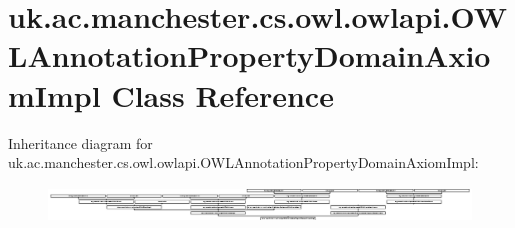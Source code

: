 \hypertarget{classuk_1_1ac_1_1manchester_1_1cs_1_1owl_1_1owlapi_1_1_o_w_l_annotation_property_domain_axiom_impl}{\section{uk.\-ac.\-manchester.\-cs.\-owl.\-owlapi.\-O\-W\-L\-Annotation\-Property\-Domain\-Axiom\-Impl Class Reference}
\label{classuk_1_1ac_1_1manchester_1_1cs_1_1owl_1_1owlapi_1_1_o_w_l_annotation_property_domain_axiom_impl}
}
Inheritance diagram for uk.\-ac.\-manchester.\-cs.\-owl.\-owlapi.\-O\-W\-L\-Annotation\-Property\-Domain\-Axiom\-Impl\-:\begin{figure}[H]
\begin{center}
\leavevmode
\includegraphics[height=0.956720cm]{classuk_1_1ac_1_1manchester_1_1cs_1_1owl_1_1owlapi_1_1_o_w_l_annotation_property_domain_axiom_impl}
\end{center}
\end{figure}
